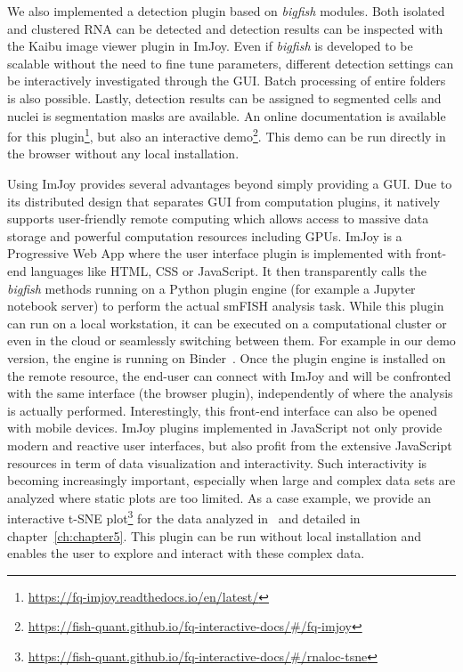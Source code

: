 We also implemented a detection plugin based on \emph{bigfish} modules.
Both isolated and clustered \ac{RNA} can be detected and detection results can be inspected with the Kaibu image viewer plugin in ImJoy.
Even if \emph{bigfish} is developed to be scalable without the need to fine tune parameters, different detection settings can be interactively investigated through the \ac{GUI}.
Batch processing of entire folders is also possible.
Lastly, detection results can be assigned to segmented cells and nuclei is segmentation masks are available.
An online documentation is available for this plugin\footnote{\url{https://fq-imjoy.readthedocs.io/en/latest/}}, but also an interactive demo\footnote{\url{https://fish-quant.github.io/fq-interactive-docs/\#/fq-imjoy}}.
This demo can be run directly in the browser without any local installation.

Using ImJoy provides several advantages beyond simply providing a \ac{GUI}.
Due to its distributed design that separates \ac{GUI} from computation plugins, it natively supports user-friendly remote computing which allows access to massive data storage and powerful computation resources including GPUs.
ImJoy is a Progressive Web App where the user interface plugin is implemented with front-end languages like HTML, CSS or JavaScript.
It then transparently calls the \emph{bigfish} methods running on a Python plugin engine (for example a Jupyter notebook server) to perform the actual \ac{smFISH} analysis task.
While this plugin can run on a local workstation, it can be executed on a computational cluster or even in the cloud or seamlessly switching between them.
For example in our demo version, the engine is running on Binder~\cite{Jupyter2018Binder2}.
Once the plugin engine is installed on the remote resource, the end-user can connect with ImJoy and will be confronted with the same interface (the browser plugin), independently of where the analysis is actually performed.
Interestingly, this front-end interface can also be opened with mobile devices.
ImJoy plugins implemented in JavaScript not only provide modern and reactive user interfaces, but also profit from the extensive JavaScript resources in term of data visualization and interactivity.
Such interactivity is becoming increasingly important, especially when large and complex data sets are analyzed where static plots are too limited.
As a case example, we provide an interactive t-SNE plot\footnote{\url{https://fish-quant.github.io/fq-interactive-docs/\#/rnaloc-tsne}} for the data analyzed in~\cite{CHOUAIB_2020} and detailed in chapter~\ref{ch:chapter5}.
This plugin can be run without local installation and enables the user to explore and interact with these complex data.

